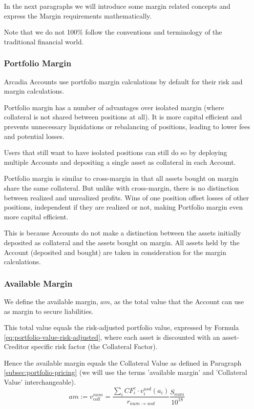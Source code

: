 \documentclass[sigconf,nonacm]{acmart}
\begin{document}
In the next paragraphs we will introduce some margin related concepts and express the Margin requirements mathematically.

Note that we do not 100\% follow the conventions and terminology of the traditional financial world.

\subsubsection{Portfolio Margin}
Arcadia Accounts use portfolio margin calculations by default for their risk and margin calculations.

Portfolio margin has a number of advantages over isolated margin (where collateral is not shared between positions at all).
It is more capital efficient and prevents unnecessary liquidations or rebalancing of positions, leading to lower fees and potential losses.

Users that still want to have isolated positions can still do so by deploying multiple Accounts and depositing a single asset as collateral in each Account.

Portfolio margin is similar to cross-margin in that all assets bought on margin share the same collateral.
But unlike with cross-margin, there is no distinction between realized and unrealized profits.
Wins of one position offset losses of other positions, independent if they are realized or not,
making Portfolio margin even more capital efficient.

This is because Accounts do not make a distinction between the assets initially deposited as collateral and the assets bought on margin.
All assets held by the Account (deposited and bought) are taken in consideration for the margin calculations.

\subsubsection{Available Margin}
\label{subsubsec:available-margin}
We define the available margin, $am$, as the total value that the Account can use as margin to secure liabilities.

This total value equals the risk-adjusted portfolio value, expressed by Formula \ref{eq:portfolio-value-risk-adjusted},
where each asset is discounted with an asset-Creditor specific risk factor (the Collateral Factor).

Hence the available margin equals the Collateral Value as defined in Paragraph \ref{subsec:portfolio-pricing}
(we will use the terms 'available margin' and 'Collateral Value' interchangeable).
\begin{equation}
    \label{eq:available-margin}
    am := v_{coll}^{num} = \frac{\sum_{i}{CF_{i}^{c} \cdot v^{usd}_{i}(a_{i})}}{r_{num\rightarrow usd}}\frac{S_{num}}{10^{18}}
\end{equation}
\end{document}
